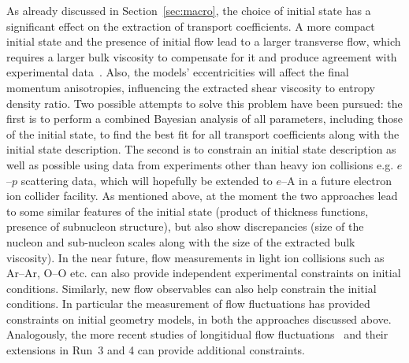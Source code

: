 As already discussed in Section~\ref{sec:macro}, the choice of initial state has 
  a significant effect on the extraction of transport coefficients. 
A more compact initial state and the presence of initial flow lead to a larger 
  transverse flow, which requires a larger bulk viscosity to compensate for it 
  and produce agreement with experimental data~\cite{Schenke:2018fci}. 
Also, the models' eccentricities will affect the final momentum anisotropies, 
  influencing the extracted shear viscosity to entropy density ratio. 
Two possible attempts to solve this problem have been pursued: 
  the first is to perform a combined Bayesian analysis of all parameters, 
  including those of the initial state, to find the best fit for all transport 
  coefficients along with the initial state description.
The second is to constrain an initial state description as well as possible 
  using data from experiments other than heavy ion collisions e.g. $e$--$p$ 
  scattering data, which will hopefully be extended to $e$--A in a future 
  electron ion collider facility.
As mentioned above, at the moment the two approaches lead to some similar 
  features of the initial state (product of thickness functions, presence 
  of subnucleon structure), but also show discrepancies (size of the nucleon 
  and sub-nucleon scales along with the size of the extracted bulk viscosity). 
In the near future, flow measurements in light ion collisions such as 
  Ar--Ar, O--O etc. can also provide independent experimental constraints 
  on initial conditions. 
Similarly, new flow observables can also help constrain the initial conditions.
In particular the measurement of flow fluctuations has provided constraints
  on initial geometry models, in both the approaches discussed above.
Analogously, the more recent studies of longitidual flow 
  fluctuations~\cite{CMS-HIN-14-012, CMS-HIN-15-008, HION-2016-04}
  and their extensions in Run~3 and 4 can provide additional constraints. 









